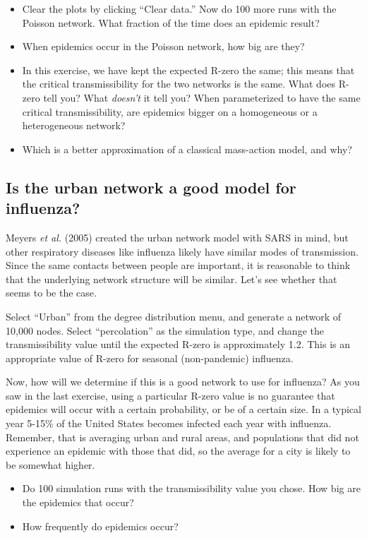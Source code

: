 \documentclass{article}
\begin{document}
\begin{itemize}
 \item Clear the plots by clicking ``Clear data.''  Now do 100 more runs with the Poisson network.  What fraction of the time does an epidemic result?

 \item When epidemics occur in the Poisson network, how big are they?

 \item In this exercise, we have kept the expected R-zero the same; this means that the critical transmissibility for the two networks is the same.  What does R-zero tell you?  What \textit{doesn't} it tell you?  When parameterized to have the same critical transmissibility, are epidemics bigger on a homogeneous or a heterogeneous network?

 \item Which is a better approximation of a classical mass-action model, and why?
\end{itemize}

\subsection{Is the urban network a good model for influenza?}
Meyers \textit{et al.} (2005) created the urban network model with SARS in mind, but other respiratory diseases like influenza likely have similar modes of transmission.  Since the same contacts between people are important, it is reasonable to think that the underlying network structure will be similar. Let's see whether that seems to be the case.

Select ``Urban'' from the degree distribution menu, and generate a network of 10,000 nodes.  Select ``percolation'' as the simulation type, and change the transmissibility value until the expected R-zero is approximately 1.2.  This is an appropriate value of R-zero for seasonal (non-pandemic) influenza.

Now, how will we determine if this is a good network to use for influenza?  As you saw in the last exercise, using a particular R-zero value is no guarantee that epidemics will occur with a certain probability, or be of a certain size.  In a typical year 5-15\% of the United States becomes infected each year with influenza.  Remember, that is averaging urban and rural areas, and populations that did not experience an epidemic with those that did, so the average for a city is likely to be somewhat higher.
\begin{itemize}
 \item Do 100 simulation runs with the transmissibility value you chose.  How big are the epidemics that occur?

 \item How frequently do epidemics occur?
\end{itemize}
\end{document}
